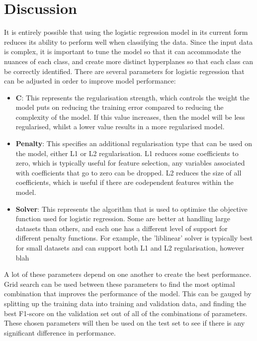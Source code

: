 \documentclass{l4proj}
\begin{document}

 
\chapter{Discussion} 
It is entirely possible that using the logistic regression model in its current form reduces its ability to perform well when classifying the data. Since the input data is complex, it is important to tune the model so that it can accommodate the nuances of each class, and create more distinct hyperplanes so that each class can be correctly identified. There are several parameters for logistic regression that can be adjusted in order to improve model performance:

\begin{itemize}
    \item \textbf{C}: This represents the regularisation strength, which controls the weight the model puts on reducing the training error compared to reducing the complexity of the model. If this value increases, then the model will be less regularised, whilst a lower value results in a more regularised model.
    \item \textbf{Penalty}: This specifies an additional regularisation type that can be used on the model, either L1 or L2 regularisation. L1 reduces some coefficients to zero, which is typically useful for feature selection, any variables associated with coefficients that go to zero can be dropped. L2 reduces the size of all coefficients, which is useful if there are codependent features within the model.
    \item \textbf{Solver}: This represents the algorithm that is used to optimise the objective function used for logistic regression. Some are better at handling large datasets than others, and each one has a different level of support for different penalty functions. For example, the 'liblinear' solver is typically best for small datasets and can support both L1 and L2 regularisation, however blah
\end{itemize}

A lot of these parameters depend on one another to create the best performance. Grid search can be used between these parameters to find the most optimal combination that improves the performance of the model. This can be gauged by splitting up the training data into training and validation data, and finding the best F1-score on the validation set out of all of the combinations of parameters. These chosen parameters will then be used on the test set to see if there is any significant difference in performance.
\end{document}
